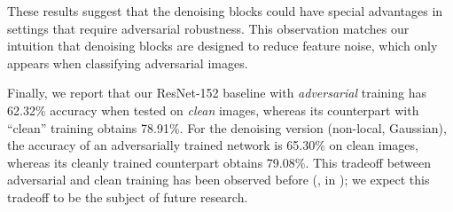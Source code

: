 \documentclass[10pt,twocolumn,letterpaper]{article}
\begin{document}
These results suggest that the denoising blocks could have special advantages in settings that require adversarial robustness. This observation matches our intuition that denoising blocks are designed to reduce feature noise, which only appears when classifying adversarial images.

Finally, we report that our ResNet-152 baseline with \emph{adversarial} training has 62.32\% accuracy when tested on \emph{clean} images, whereas its counterpart with ``clean'' training obtains 78.91\%. 
For the denoising version (non-local, Gaussian), the accuracy of an adversarially trained network is 65.30\% on clean images, whereas its cleanly trained counterpart obtains 79.08\%. This tradeoff between adversarial and clean training has been observed before (\eg, in \cite{Tsipras2018}); we expect this tradeoff to be the subject of future research.

\renewcommand\arraystretch{1.05}
\setlength{\tabcolsep}{5pt}
\begin{table}[t]
\centering
{}
\vspace{.5em}
\caption{\textbf{Accuracy on clean images} in the ImageNet validation set when trained on clean images. 
All numbers except the first row are reported as the accuracy difference comparing with the first R-152 baseline result.
For R-152, we run training 3 times independently, to show the natural random variation of the same architecture.
All denoising models show \emph{no significant difference}, and are within $\pm$0.2\% of the baseline R-152's result.
}
\label{tab:clean}
\vspace{-1em}
\end{table}
\end{document}
